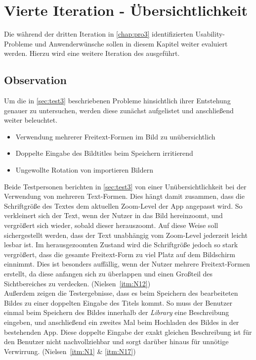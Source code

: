 \chapter{Vierte Iteration - Übersichtlichkeit}
Die während der dritten Iteration in \autoref{chap:pro3} identifizierten Usability-Probleme und Anwenderwünsche sollen in diesem Kapitel weiter evaluiert werden.
Hierzu wird eine weitere Iteration des \hcdp{} ausgeführt.

\section{Observation}
Um die in \autoref{sec:test3} beschriebenen Probleme hinsichtlich ihrer Entstehung genauer zu untersuchen, werden diese zunächst aufgelistet und anschließend weiter beleuchtet.

\begin{itemize}
  \item Verwendung mehrerer Freitext-Formen im Bild zu unübersichtlich
  \item Doppelte Eingabe des Bildtitles beim Speichern irritierend
  \item Ungewollte Rotation von importieren Bildern
\end{itemize}

\noindent
Beide Testpersonen berichten in \autoref{sec:test3} von einer Unübersichtlichkeit bei der Verwendung von mehreren Text-Formen.
Dies hängt damit zusammen, dass die Schriftgröße des Textes dem aktuellen Zoom-Level der App angepasst wird.
So verkleinert sich der Text, wenn der Nutzer in das Bild hereinzoomt, und vergrößert sich wieder, sobald dieser herauszoomt.
Auf diese Weise soll sichergestellt werden, dass der Text unabhängig vom Zoom-Level jederzeit leicht lesbar ist.
Im herausgezoomten Zustand wird die Schriftgröße jedoch so stark vergrößert, dass die gesamte Freitext-Form zu viel Platz auf dem Bildschirm einnimmt.
Dies ist besonders auffällig, wenn der Nutzer mehrere Freitext-Formen erstellt, da diese anfangen sich zu überlappen und einen Großteil des Sichtbereiches zu verdecken.
(Nielsen~\autoref{itm:N12}) \\ 

Außerdem zeigen die Testergebnisse, dass es beim Speichern des bearbeiteten Bildes zu einer doppelten Eingabe des Titels kommt.
So muss der Benutzer einmal beim Speichern des Bildes innerhalb der \emph{Library} eine Beschreibung eingeben, und anschließend ein zweites Mal beim Hochladen des Bildes in der bestehenden App.
Diese doppelte Eingabe der exakt gleichen Beschreibung ist für den Benutzer nicht nachvollziehbar und sorgt darüber hinaus für unnötige Verwirrung.
(Nielsen~\autoref{itm:N1} \& \autoref{itm:N17}) \\


